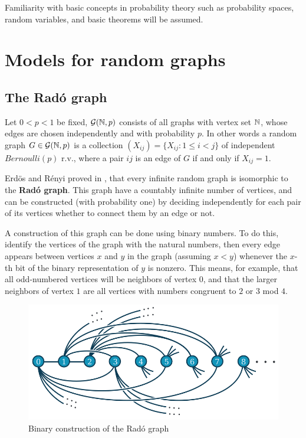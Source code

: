 Familiarity with basic concepts in probability theory such as probability spaces, random variables, and basic theorems will be assumed.

\section{Models for random graphs}

\subsection{The Radó graph}
Let $0 < p < 1$ be fixed, $\mathcal{G}(\mathbb{N}, p)$ consists of all graphs with vertex set $\mathbb{N}$, whose edges are chosen independently and with probability $p$. In other words a random graph $G \in \mathcal{G}(\mathbb{N},p)$ is a collection $(X_{ij}) = \{ X_{ij} : 1 \leq i < j\}$ of independent $Bernoulli(p)$ r.v., where a pair $ij$ is an edge of $G$ if and only if $X_{ij} = 1$.

Erdös and Rényi proved in \cite[Erdös, Rényi]{RadoUnique}, that every infinite random graph is isomorphic to the \textbf{Radó graph}. This graph have a countably infinite number of vertices, and can be constructed (with probability one) by deciding independently for each pair of its vertices whether to connect them by an edge or not.

A construction of this graph can be done using binary numbers. To do this, identify the vertices of the graph with the natural numbers, then every edge appears between vertices $x$ and $y$ in the graph (assuming $x < y$) whenever the $x$-th bit of the binary representation of $y$ is nonzero. This means, for example, that all odd-numbered vertices will be neighbors of vertex $0$, and that the larger neighbors of vertex $1$ are all vertices with numbers congruent to $2$ or $3$ mod $4$. 

\begin{figure}[h!]
	\centering
	\includegraphics[scale=0.7]{Figures/Rado-graph.png}
	\caption{Binary construction of the Radó graph}
\end{figure}

